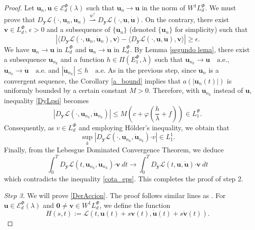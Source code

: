 \documentclass[twoside]{elsarticle}
\theoremstyle{remark}
\newcommand{\lphi}{L^{\Phi}}
\newcommand{\lpsi}{L^{\Psi}}
\newcommand{\ephi}{E^{\Phi}}
\newcommand{\wphi}{W^{1}\lphi}
\newcommand{\domi}{\mathcal{E}^{\Phi}_d(\lambda)}
\renewcommand{\b}[1]{\boldsymbol{#1}}
\newcommand{\ccdot}{\b{\cdot}}
\renewcommand{\leq}{\leqslant}
\begin{document}
\begin{proof}
Let $\b{u}_n,\b{u}\in \domi$ such that $\b{u}_n\to \b{u}$ in the norm of $\wphi_d$. 
We must prove that  $D_{\b{y}}\mathcal{L}(\cdot,\b{u}_n,\dot{\b{u}}_n)\overset{w^*}{\rightharpoonup} D_{\b{y}}\mathcal{L}(\cdot,\b{u},\b{\dot{u}})$. On the contrary, there exist $\b{v}\in\lphi_d$, $\epsilon>0$ and a subsequence of $\{\b{u}_n\}$ (denoted  $\{\b{u}_n\}$ for simplicity)  such that
\begin{equation}\label{cota_eps}
 \left| \langle D_{\b{y}}\mathcal{L}(\cdot,\b{u}_n,\b{\dot{u}}_n),\b{v} \rangle - \langle  D_{\b{y}}\mathcal{L}(\cdot,\b{u},\b{\dot{u}}),\b{v} \rangle\right|\geq \epsilon.
\end{equation}
We have $\b{u}_n\rightarrow \b{u}$ in $\lphi_d$ and
$\b{\dot{u}}_n\rightarrow \b{\dot{u}}$ in $\lphi_d$. By Lemma \ref{segundo lema}, there exist a subsequence $\b{u}_{n_k}$ and a function $h\in \Pi(\ephi_1,\lambda)$ such that $\b{u}_{n_k}\rightarrow \b{u} \quad\text{a.e.}$, $\b{\dot{u}}_{n_k}\rightarrow \b{\dot{u}} \quad\text{a.e.}$ and $|\b{\dot{u}}_{n_k}|\leq h\quad\text{a.e.}$ 
As in the previous step, since $\b{u}_n$ is a convergent sequence, the Corollary \ref{a_bound} implies that $a(|\b{u}_n(t)|)$ is uniformly bounded by a certain constant $M>0$. 
Therefore,  with $\b{u}_{n_k}$ instead of $\b{u}$, inequality  \eqref{DyLpsi} becomes 
\begin{equation}\label{Dy-suc}
  \left | D_{\b{y}}\mathcal{L}(\cdot,\b{u}_{n_k},\b{\dot{u}}_{n_k})  \right| 
	\leq M\left(c+\varphi\left(\frac{h}{\lambda}+f\right)\right)\in \lpsi_1.
\end{equation}
Consequently, as $v \in \lphi_d$ and employing H\"older's inequality, we obtain that
\[\sup_k|D_{\b{y}}\mathcal{L}(\cdot,\b{u}_{n_k},\b{\dot{u}}_{n_k})\ccdot v| \in L^1_1.\]
  Finally, from the Lebesgue Dominated Convergence Theorem, we deduce
\begin{equation}\label{conv_debil}\int_0^T  D_{\b{y}}\mathcal{L}(t,\b{u}_{n_k},\b{\dot{u}}_{n_k})\ccdot\b{ v} \ dt \to \int_0^T D_{\b{y}}\mathcal{L}(t,\b{u},\b{\dot{u}})\ccdot\b{ v}\ dt \end{equation}
which contradicts the inequality \eqref{cota_eps}. This completes the proof of step 2.

\emph{Step 3.} We will prove \eqref{DerAccion}. The proof follows similar lines as \cite[Thm. 1.4]{mawhin2010critical}. For $\b{u}\in \domi$ and $\b{0}\neq\b{v}\in\wphi_d$, we define the function
\[H(s,t):=\mathcal{L}(t,\b{u}(t)+s\b{v}(t),\b{\dot{u}}(t)+s\b{\dot{v}}(t)).\]


\end{proof}
\end{document}
